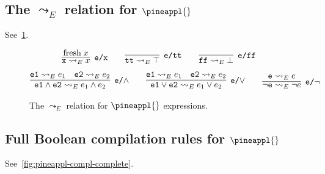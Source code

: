 \subsection{The $\leadsto_E$ relation for $\pineappl{}$}
\label{appendix:pineappl bc}

See~\cref{fig:pineappl-e}.

\begin{figure}
\begin{mdframed}
  {\footnotesize
  \begin{align*}
    \infer[\texttt{e/x}]
    {
      \texttt{x} \leadsto_E x
    }
    {\mathrm{fresh} \; x}
    \qquad
    \infer[\texttt{e/tt}]
    {
      \texttt{tt} \leadsto_E \top
    }
    {}
    \qquad
    \infer[\texttt{e/ff}]
    {
      \texttt{ff} \leadsto_E \bot
    }
    {}
  \end{align*}
  \begin{align*}
    \infer[\texttt{e/}\land]
    {
      \texttt{e1} \land \texttt{e2}
    \leadsto_E e_1 \land e_2
    }
    { \texttt{e1} \leadsto_E e_1 & \texttt{e2} \leadsto_E e_2}
    \qquad
    \infer[\texttt{e/}\lor]
    {
      \texttt{e1} \lor \texttt{e2} \leadsto_E e_1 \lor e_2
    }
    { \texttt{e1} \leadsto_E e_1 & \texttt{e2} \leadsto_E e_2}
    \qquad
    \infer[\texttt{e/}\neg]
    {
      \neg \texttt{e} \leadsto_E \neg e
    }
    { \texttt{e} \leadsto_E e}
  \end{align*}
  }
\end{mdframed}
\caption{The $\leadsto_E$ relation for $\pineappl{}$ expressions.}
\label{fig:pineappl-e}
\end{figure}

\subsection{Full Boolean compilation rules for $\pineappl{}$}
\label{appendix:pineappl-compl-complete}

See~\cref{fig:pineappl-compl-complete}.

